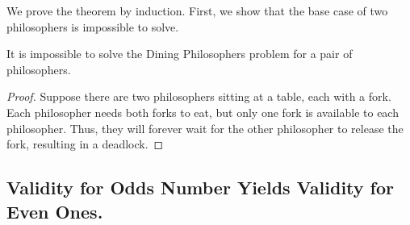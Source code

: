 \documentclass[manuscript,screen,review]{acmart}
\begin{document}
  We prove the theorem by induction. First, we show that the base case of two philosophers is impossible to solve.

\begin{claim}
  It is impossible to solve the Dining Philosophers problem for a pair of philosophers.
\end{claim}
\begin{proof} 
  Suppose there are two philosophers sitting at a table, each with a fork. Each philosopher needs both forks to eat, but only one fork is available to each philosopher. Thus, they will forever wait for the other philosopher to release the fork, resulting in a deadlock.
\end{proof}

\subsection{Validity for Odds Number Yields Validity for Even Ones.}  
\end{document}
